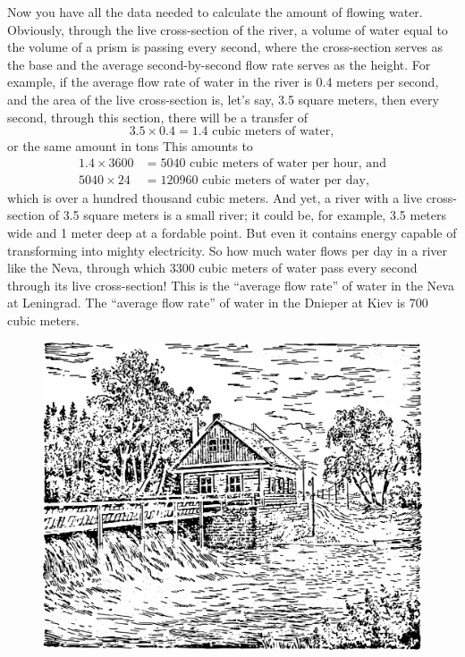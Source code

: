 Now you have all the data needed to calculate the amount of flowing water. Obviously, through the live cross-section of the river, a volume of water equal to the volume of a prism is passing every second, where the cross-section serves as the base and the average second-by-second flow rate serves as the height. For example, if the average flow rate of water in the river is 0.4 meters per second, and the area of the live cross-section is, let's say, 3.5 square meters, then every second, through this section, there will be a transfer of
\begin{equation*}%
3.5 \times 0.4 = 1.4 \,\, \text{cubic meters of water},
\end{equation*}
or the same amount in tons This amounts to 
\begin{align*}%
1.4 \times 3600 & = 5040 \,\, \text{cubic meters of water per hour, and}\\
5040 \times 24 & = \num{120960} \,\, \text{cubic meters of water per day},
\end{align*}
which is over a hundred thousand cubic meters. And yet, a river with a live cross-section of 3.5 square meters is a small river; it could be, for example, 3.5 meters wide and 1 meter deep at a fordable point. But even it contains energy capable of transforming into mighty electricity. So how much water flows per day in a river like the Neva, through which 3300 cubic meters of water pass every second through its live cross-section! This is the ``average flow rate'' of water in the Neva at Leningrad. The ``average flow rate'' of water in the Dnieper at Kiev is 700 cubic meters.

\begin{figure}[h!]
\centering
\includegraphics[width=\textwidth]{figures/ch-02/fig-043.pdf}
\end{figure}

